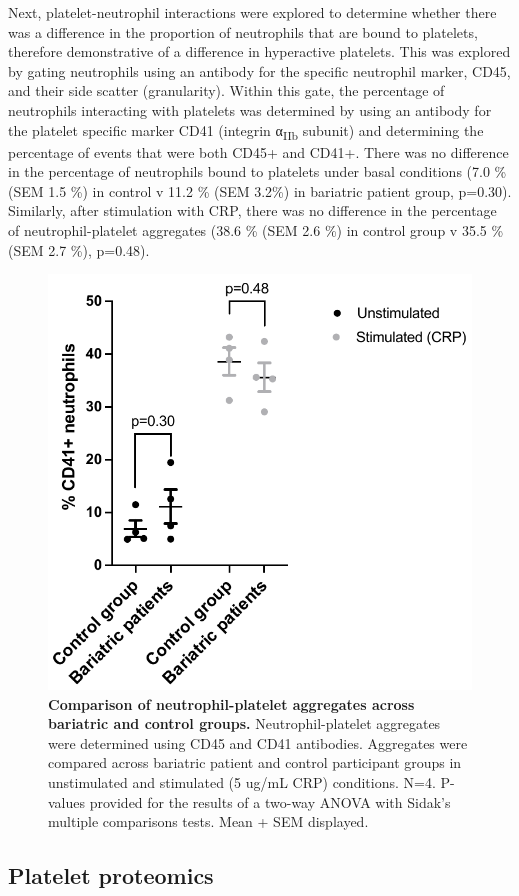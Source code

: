 \documentclass[11pt,twoside]{bristolthesis}
\begin{document}
Next, platelet-neutrophil interactions were explored to determine whether there was a difference in the proportion of neutrophils that are bound to platelets, therefore demonstrative of a difference in hyperactive platelets. This was explored by gating neutrophils using an antibody for the specific neutrophil marker, CD45, and their side scatter (granularity). Within this gate, the percentage of neutrophils interacting with platelets was determined by using an antibody for the platelet specific marker CD41 (integrin α\textsubscript{IIb} subunit) and determining the percentage of events that were both CD45+ and CD41+. There was no difference in the percentage of neutrophils bound to platelets under basal conditions (7.0 \% (SEM 1.5 \%) in control v 11.2 \% (SEM 3.2\%) in bariatric patient group, p=0.30). Similarly, after stimulation with CRP, there was no difference in the percentage of neutrophil-platelet aggregates (38.6 \% (SEM 2.6 \%) in control group v 35.5 \% (SEM 2.7 \%), p=0.48).



\begin{figure}

{\centering \includegraphics[width=0.7\linewidth]{figure/Bariatric_study/Plt-neu_aggregates} 

}

\caption[Comparison of neutrophil-platelet aggregates across bariatric and control groups.]{\textbf{Comparison of neutrophil-platelet aggregates across bariatric and control groups.} Neutrophil-platelet aggregates were determined using CD45 and CD41 antibodies. Aggregates were compared across bariatric patient and control participant groups in unstimulated and stimulated (5 ug/mL CRP) conditions. N=4. P-values provided for the results of a two-way ANOVA with Sidak's multiple comparisons tests. Mean + SEM displayed.}\label{fig:platelet-neutrophil}
\end{figure}
\hypertarget{platelet-proteomics}{%
\subsection{Platelet proteomics}\label{platelet-proteomics}}
\end{document}
